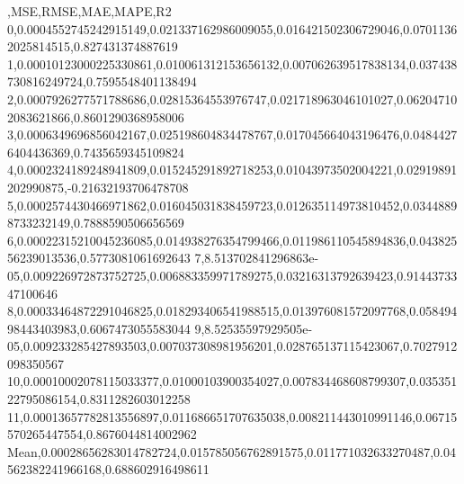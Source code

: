 ,MSE,RMSE,MAE,MAPE,R2
0,0.0004552745242915149,0.021337162986009055,0.016421502306729046,0.07011362025814515,0.827431374887619
1,0.00010123000225330861,0.010061312153656132,0.007062639517838134,0.037438730816249724,0.7595548401138494
2,0.0007926277571788686,0.02815364553976747,0.021718963046101027,0.062047102083621866,0.8601290368958006
3,0.0006349696856042167,0.025198604834478767,0.017045664043196476,0.04844276404436369,0.7435659345109824
4,0.0002324189248941809,0.015245291892718253,0.01043973502004221,0.02919891202990875,-0.21632193706478708
5,0.0002574430466971862,0.016045031838459723,0.012635114973810452,0.03448898733232149,0.7888590506656569
6,0.00022315210045236085,0.014938276354799466,0.011986110545894836,0.04382556239013536,0.5773081061692643
7,8.513702841296863e-05,0.009226972873752725,0.006883359971789275,0.03216313792639423,0.9144373347100646
8,0.00033464872291046825,0.018293406541988515,0.013976081572097768,0.05849498443403983,0.6067473055583044
9,8.52535597929505e-05,0.009233285427893503,0.007037308981956201,0.028765137115423067,0.7027912098350567
10,0.00010002078115033377,0.01000103900354027,0.007834468608799307,0.03535122795086154,0.8311282603012258
11,0.00013657782813556897,0.011686651707635038,0.008211443010991146,0.06715570265447554,0.8676044814002962
Mean,0.00028656283014782724,0.015785056762891575,0.011771032633270487,0.04562382241966168,0.688602916498611

